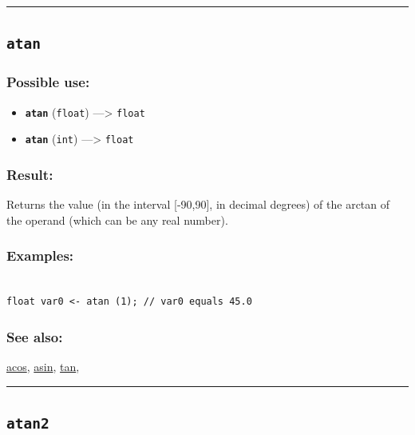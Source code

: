 \documentclass[]{book}
\providecommand{\tightlist}{%
  \setlength{\itemsep}{0pt}\setlength{\parskip}{0pt}}
\theoremstyle{definition}
\theoremstyle{definition}
\theoremstyle{definition}
\theoremstyle{remark}
\begin{document}
\begin{center}\rule{0.5\linewidth}{\linethickness}\end{center}

\subsection{\texorpdfstring{\texttt{atan}}{atan}}\label{atan}

\subsubsection{Possible use:}\label{possible-use-59}

\begin{itemize}
\tightlist
\item
  \textbf{\texttt{atan}} (\texttt{float}) ---\textgreater{}
  \texttt{float}
\item
  \textbf{\texttt{atan}} (\texttt{int}) ---\textgreater{} \texttt{float}
\end{itemize}

\subsubsection{Result:}\label{result-58}

Returns the value (in the interval {[}-90,90{]}, in decimal degrees) of
the arctan of the operand (which can be any real number).

\subsubsection{Examples:}\label{examples-49}

\begin{verbatim}
 
float var0 <- atan (1); // var0 equals 45.0
\end{verbatim}

\subsubsection{See also:}\label{see-also-41}

\href{operators-a-to-a.html\#acos}{acos},
\href{operators-a-to-a.html\#asin}{asin},
\href{operators-s-to-z.html\#tan}{tan},

\begin{center}\rule{0.5\linewidth}{\linethickness}\end{center}

\subsection{\texorpdfstring{\texttt{atan2}}{atan2}}\label{atan2}
\end{document}

